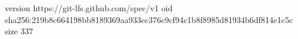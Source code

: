 version https://git-lfs.github.com/spec/v1
oid sha256:219b8c664198bb8189369aa933ec376c9cf94c1b8f8985d81934b6df814e1c5c
size 337
